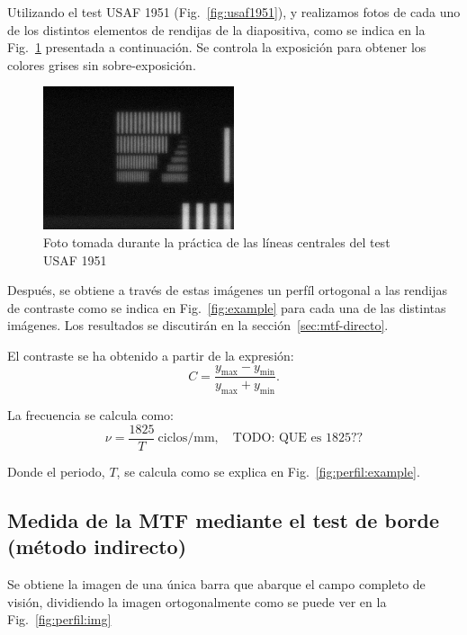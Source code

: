 \documentclass{./packages/optica-article}
\begin{document}
Utilizando el test USAF 1951 (Fig.~\ref{fig:usaf1951}), y realizamos fotos de cada uno de los distintos elementos de rendijas de la diapositiva, como se indica en la Fig.~\ref{fig:usafpic} presentada a continuación. Se controla la exposición para obtener los colores grises sin sobre-exposición.

\begin{figure}[!h]
	\centering
	\includegraphics[width=0.5\textwidth]{smallest_lines}
	\caption{Foto tomada durante la práctica de las líneas centrales del test USAF 1951}\label{fig:usafpic}
\end{figure}

Después, se obtiene a través de estas imágenes un perfíl ortogonal a las rendijas de contraste como se indica en Fig.~\ref{fig:example} para cada una de las distintas imágenes. Los resultados se discutirán en la sección~\ref{sec:mtf-directo}.



El contraste se ha obtenido a partir de la expresión: 
\nopagebreak
\begin{equation}
	C = \frac{y_{\max} - y_{\min}}{y_{\max} + y_{\min}}.
	\label{eq:contraste}
\end{equation}

La frecuencia se calcula como:
\nopagebreak
\begin{equation}
	\nu = \frac{1825}{T}\ \textrm{ciclos/mm},\quad\textrm{TODO: QUE es 1825??}
	\label{eq:frecuencia}
\end{equation}

Donde el periodo, $T$, se calcula como se explica en Fig.~\ref{fig:perfil:example}.

\subsection{Medida de la MTF mediante el test de borde (método indirecto)}\label{sec:description:indirecto}

Se obtiene la imagen de una única barra que abarque el campo completo de visión, dividiendo la imagen ortogonalmente como se puede ver en la Fig.~\ref{fig:perfil:img}
\end{document}
